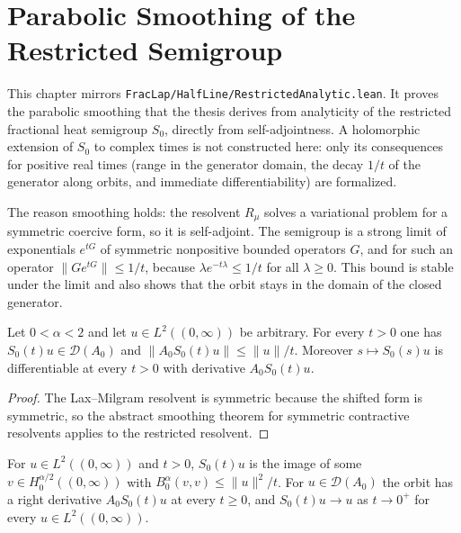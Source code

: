 \chapter{Parabolic Smoothing of the Restricted Semigroup}

This chapter mirrors \texttt{FracLap/HalfLine/RestrictedAnalytic.lean}. It proves the parabolic smoothing that the thesis derives from analyticity of the restricted fractional heat semigroup $S_0$, directly from self-adjointness. A holomorphic extension of $S_0$ to complex times is not constructed here: only its consequences for positive real times (range in the generator domain, the decay $1/t$ of the generator along orbits, and immediate differentiability) are formalized.

The reason smoothing holds: the resolvent $R_\mu$ solves a variational problem for a symmetric coercive form, so it is self-adjoint. The semigroup is a strong limit of exponentials $e^{tG}$ of symmetric nonpositive bounded operators $G$, and for such an operator $\lVert G e^{tG} \rVert \le 1/t$, because $\lambda e^{-t\lambda} \le 1/t$ for all $\lambda \ge 0$. This bound is stable under the limit and also shows that the orbit stays in the domain of the closed generator.

\begin{theorem}\label{thm:restricted_smoothing}
\leanok
Let $0 < \alpha < 2$ and let $u \in L^2((0,\infty))$ be arbitrary. For every $t > 0$ one has $S_0(t) u \in \mathcal{D}(A_0)$ and $\lVert A_0 S_0(t) u \rVert \le \lVert u \rVert / t$. Moreover $s \mapsto S_0(s) u$ is differentiable at every $t > 0$ with derivative $A_0 S_0(t) u$.
\end{theorem}

\begin{proof}
\leanok
The Lax--Milgram resolvent is symmetric because the shifted form is symmetric, so the abstract smoothing theorem for symmetric contractive resolvents applies to the restricted resolvent.
\end{proof}

\begin{theorem}\label{thm:restricted_orbit_properties}
\leanok
For $u \in L^2((0,\infty))$ and $t > 0$, $S_0(t) u$ is the image of some $v \in H_0^{\alpha/2}((0,\infty))$ with $B_0^\alpha(v, v) \le \lVert u \rVert^2 / t$. For $u \in \mathcal{D}(A_0)$ the orbit has a right derivative $A_0 S_0(t) u$ at every $t \ge 0$, and $S_0(t) u \to u$ as $t \to 0^+$ for every $u \in L^2((0,\infty))$.
\end{theorem}

